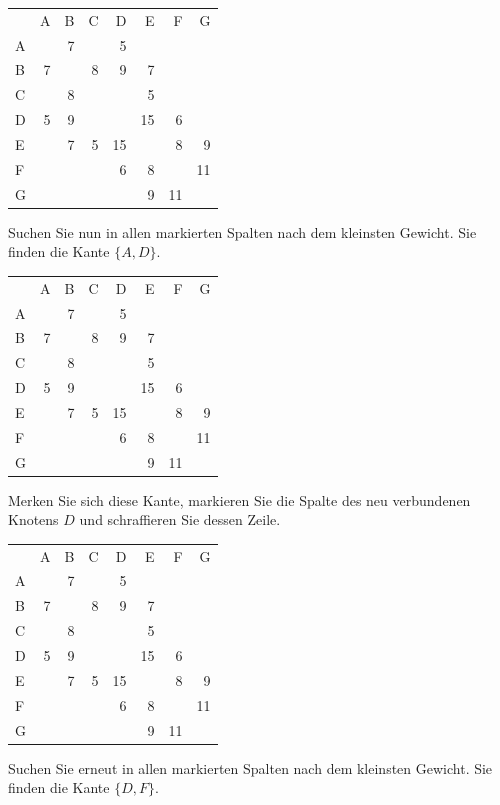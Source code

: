 \documentclass[12pt,a4paper]{report}
\theoremstyle{break}
\theoremstyle{plain}
\newcommand{\ucl}{\ding{56}}
\newcommand{\ign}{\rowcolor[gray]{0.5}}
\newcommand{\usd}[1]{{\cellcolor{SkyBlue}#1}}
\newcommand{\sel}[1]{{\cellcolor{LimeGreen}#1}}
\newcommand{\byp}[1]{{\cellcolor{LimeGreen!10}#1}}
\newcommand{\matrixstep}[2]{\noindent\parbox{6cm}{\scriptsize #1}
  \hfill
  \parbox{7cm}{\small #2}
  \vskip 2mm
}
\begin{document}
\matrixstep{
\begin{tabular}{|l|r|r|r|r|r|r|r|}\hline
   & \ucl &   &   &   &   &   &   \\ \hline
   & A & B & C & D & E & F & G \\ \hline
\ign A &   & 7 &   & 5 &   &    &    \\
B & \byp{7} &   & 8 & 9 & 7 &   &   \\
C &   & 8 &   &   & 5 &   &   \\
D & \sel{5} & 9 &   &   &15 & 6 &   \\
E &   & 7 & 5 &15 &   & 8 & 9 \\
F &   &   &   & 6 & 8 &   &11 \\
G &   &   &   &   & 9 &11 & \\ 
\hline
\end{tabular}}{
Suchen Sie nun in allen markierten Spalten nach dem kleinsten
Gewicht. Sie finden die Kante $\{A,D\}$.
}
\matrixstep{
\begin{tabular}{|l|r|r|r|r|r|r|r|}\hline
   & \ucl &   &   & \ucl  &   &   &   \\ \hline
   & A & B & C & D & E & F & G \\ \hline
\ign A &   & 7 &   & \usd{5} &   &    &    \\
B & 7 &   & 8 & 9 & 7 &   &   \\
C &   & 8 &   &   & 5 &   &   \\
\ign D & \usd{5} & 9 &   &   &15 & 6 &   \\
E &   & 7 & 5 &15 &   & 8 & 9 \\
F &   &   &   & 6 & 8 &   &11 \\
G &   &   &   &   & 9 &11 & \\ 
\hline
\end{tabular}}{
Merken Sie sich diese Kante, markieren Sie die Spalte des neu
verbundenen Knotens $D$ und schraffieren Sie dessen Zeile.
}
\matrixstep{
\begin{tabular}{|l|r|r|r|r|r|r|r|}\hline
   & \ucl &   &   & \ucl  &   &   &   \\ \hline
   & A & B & C & D & E & F & G \\ \hline
\ign A &   & 7 &   & \usd{5} &   &    &    \\
B & \byp{7} &   & 8 & \byp{9} & 7 &   &   \\
C &   & 8 &   &   & 5 &   &   \\
\ign D & \usd{5} & 9 &   &   &15 & 6 &   \\
E &   & 7 & 5 &\byp{15} &   & 8 & 9 \\
F &   &   &   & \sel{6} & 8 &   &11 \\
G &   &   &   &   & 9 &11 & \\ 
\hline
\end{tabular}}{
Suchen Sie erneut in allen markierten Spalten nach dem kleinsten
Gewicht. Sie finden die Kante $\{D,F\}$.
}
\end{document}
